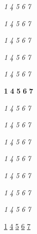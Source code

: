 \usepackage{soul}  %


\let\booktitle\textit
\soulregister\booktitle1
\soulregister\booktitle4
\soulregister\booktitle5
\soulregister\booktitle6
\soulregister\booktitle7

\let\book\textit
\soulregister\book1
\soulregister\book4
\soulregister\book5
\soulregister\book6
\soulregister\book7

\let\journaltitle\textit
\soulregister\journaltitle1
\soulregister\journaltitle4
\soulregister\journaltitle5
\soulregister\journaltitle6
\soulregister\journaltitle7

\let\journal\textit
\soulregister\journal1
\soulregister\journal4
\soulregister\journal5
\soulregister\journal6
\soulregister\journal7

\let\newspaper\textit
\soulregister\newspaper1
\soulregister\newspaper4
\soulregister\newspaper5
\soulregister\newspaper6
\soulregister\newspaper7

\let\vol\textbf  %
\soulregister\vol1
\soulregister\vol4
\soulregister\vol5
\soulregister\vol6
\soulregister\vol7 

\let\latin\textit
\soulregister\latin1
\soulregister\latin4
\soulregister\latin5
\soulregister\latin6
\soulregister\latin7 


\let\french\textit
\soulregister\french1
\soulregister\french4
\soulregister\french5
\soulregister\french6
\soulregister\french7

\let\greek\textit
\soulregister\greek1
\soulregister\greek4
\soulregister\greek5
\soulregister\greek6
\soulregister\greek7

\let\german\textit
\soulregister\german1
\soulregister\german4
\soulregister\german5
\soulregister\german6
\soulregister\german7

\let\italian\textit
\soulregister\italian1
\soulregister\italian4
\soulregister\italian5
\soulregister\italian6
\soulregister\italian7

\let\portuguese\textit
\soulregister\portuguese1
\soulregister\portuguese4
\soulregister\portuguese5
\soulregister\portuguese6
\soulregister\portuguese7

\let\port\textit
\soulregister\port1
\soulregister\port4
\soulregister\port5
\soulregister\port6
\soulregister\port7

\soulregister\uline1
\soulregister\uline4
\soulregister\uline5
\soulregister\uline6
\soulregister\uline7  %

\soulregister{}
\soulregister{}
\soulregister{}
\soulregister{}
\soulregister{}  %


